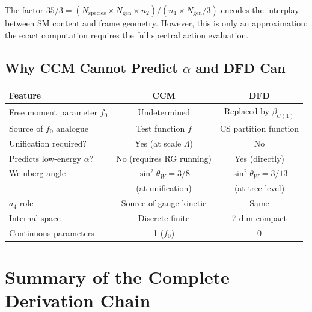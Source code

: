 \documentclass[12pt,a4paper]{article}
\begin{document}
The factor $35/3 = (N_{\mathrm{species}} \times N_{\mathrm{gen}} \times n_2)/(n_1 \times N_{\mathrm{gen}}/3)$
encodes the interplay between SM content and frame geometry.  However, this
is only an approximation; the exact computation requires the full spectral
action evaluation.

\subsection{Why CCM Cannot Predict $\alpha$ and DFD Can}

\begin{center}
\renewcommand{\arraystretch}{1.3}
\begin{tabular}{p{5.5cm}cc}
\toprule
\textbf{Feature} & \textbf{CCM} & \textbf{DFD} \\
\midrule
Free moment parameter $f_0$ & Undetermined & Replaced by $\beta_{U(1)}$ \\
Source of $f_0$ analogue & Test function $f$ & CS partition function \\
Unification required? & Yes (at scale $\Lambda$) & No \\
Predicts low-energy $\alpha$? & No (requires RG running) & Yes (directly) \\
Weinberg angle & $\sin^2\theta_W = 3/8$ & $\sin^2\theta_W = 3/13$ \\
 & (at unification) & (at tree level) \\
$a_4$ role & Source of gauge kinetic & Same \\
Internal space & Discrete finite & 7-dim compact \\
Continuous parameters & 1 ($f_0$) & 0 \\
\bottomrule
\end{tabular}
\end{center}

\section{Summary of the Complete Derivation Chain}
\label{sec:summary}
\end{document}
